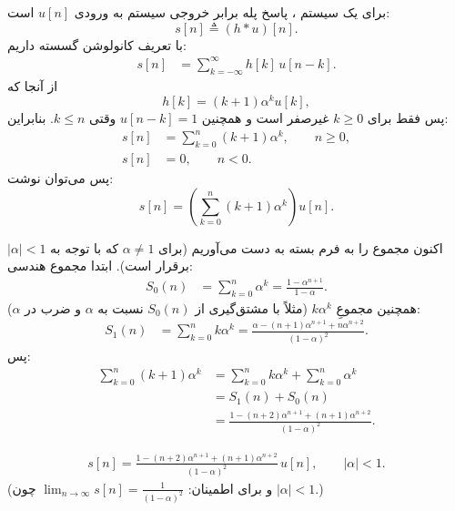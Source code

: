برای یک سیستم ، پاسخ پله برابر خروجی سیستم به ورودی $u[n]$ است:
$$s[n] \triangleq (h*u)[n].$$
با تعریف کانولوشن گسسته داریم:
\begin{align*}
s[n] &= \sum_{k=-\infty}^{\infty} h[k]\,u[n-k].
\end{align*}
از آنجا که
$$h[k] = (k+1)\alpha^k u[k],$$
پس فقط برای $k\ge 0$ غیرصفر است و همچنین $u[n-k]=1$ وقتی $k\le n$.
بنابراین:
\begin{align*}
s[n] &= \sum_{k=0}^{n} (k+1)\alpha^k,\qquad n\ge 0,\\
s[n] &= 0,\qquad n<0.
\end{align*}
پس می‌توان نوشت:
$$s[n] = \left(\sum_{k=0}^{n} (k+1)\alpha^k\right)u[n].$$

اکنون مجموع را به فرم بسته به دست می‌آوریم (برای $\alpha\neq 1$ که با توجه به $|\alpha|<1$ برقرار است).
ابتدا مجموع هندسی:
\begin{align*}
S_0(n) &= \sum_{k=0}^{n}\alpha^k = \frac{1-\alpha^{n+1}}{1-\alpha}.
\end{align*}
همچنین مجموعِ $k\alpha^k$ (مثلاً با مشتق‌گیری از $S_0(n)$ نسبت به $\alpha$ و ضرب در $\alpha$):
\begin{align*}
S_1(n) &= \sum_{k=0}^{n} k\alpha^k
= \frac{\alpha-(n+1)\alpha^{n+1}+n\alpha^{n+2}}{(1-\alpha)^2}.
\end{align*}
پس:
\begin{align*}
\sum_{k=0}^{n}(k+1)\alpha^k
&= \sum_{k=0}^{n}k\alpha^k + \sum_{k=0}^{n}\alpha^k \\
&= S_1(n)+S_0(n) \\
&= \frac{1-(n+2)\alpha^{n+1}+(n+1)\alpha^{n+2}}{(1-\alpha)^2}.
\end{align*}

\begin{align*}
s[n] = \frac{1-(n+2)\alpha^{n+1}+(n+1)\alpha^{n+2}}{(1-\alpha)^2}\,u[n],
\qquad |\alpha|<1.
\end{align*}
(و برای اطمینان: $\lim_{n\to\infty}s[n]=\frac{1}{(1-\alpha)^2}$ چون $|\alpha|<1$.)